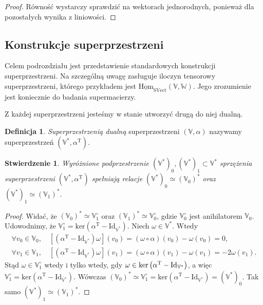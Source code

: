 \documentclass[11pt,a4paper]{report}
\newtheorem{proposition}[theorem]{Stwierdzenie}
\theoremstyle{definition}
\newtheorem{definition}[theorem]{Definicja}
\begin{document}
\begin{proof}
 Równość wystarczy sprawdzić na wektorach jednorodnych, ponieważ dla pozostałych wynika z liniowości.
\end{proof}

\subsection{Konstrukcje superprzestrzeni}

Celem podrozdziału jest przedstawienie standardowych konstrukcji superprzestrzeni. Na szczególną uwagę zasługuje iloczyn tensorowy superprzestrzeni, którego przykładem jest $\underline{\mathrm{Hom}}_{\mathrm{SVect}}(\mathbb{V},\mathbb{W})$. Jego zrozumienie jest koniecznie do badania supermacierzy.

Z każdej superprzestrzeni jesteśmy w stanie utworzyć drugą do niej dualną.

\begin{definition}
\textit{Superprzestrzenią dualną} superprzestrzeni $(\mathbb{V},\alpha)$ nazywamy superprzestrzeń $(\mathbb{V}^*,\alpha^\mathrm{T}).$
\end{definition}

\begin{proposition}
Wyróżnione podprzestrzenie $(\mathbb{V}^*)_0,(\mathbb{V}^*)_1 \subset \mathbb{V}^*$ sprzężenia superprzestrzeni $(\mathbb{V}^*,\alpha^\mathrm{T})$ spełniają relacje $(\mathbb{V}^*)_0 \simeq (\mathbb{V}_0)^*$ oraz  $(\mathbb{V}^*)_1 \simeq (\mathbb{V}_1)^*.$
\end{proposition}

\begin{proof}
 Widać, że $(\mathbb{V}_0)^* \simeq \mathbb{V}_1^{\circ}$ oraz $(\mathbb{V}_1)^* \simeq \mathbb{V}_0^{\circ}$, gdzie $\mathbb{V}_0^{\circ}$ jest anihilatorem $\mathbb{V}_0$. Udowodnimy, że $\mathbb{V}_1^{\circ} = \textrm{ker} \left( \alpha^\mathrm{T} - \textrm{Id}_{\mathbb{V}^*}\right)\!.$ Niech $\omega \in \mathbb{V}^*$. Wtedy
\begin{equation*} 
\begin{gathered}
\forall v_0 \in \mathbb{V}_0, \quad \left[ \left( \alpha^\mathrm{T} - \textrm{Id}_{\mathbb{V}^*}\right) \omega \right] (v_0) = \left( \omega \circ \alpha \right) (v_0) - \omega (v_0) = 0, \\
\forall v_1 \in \mathbb{V}_1, \quad \left[ \left( \alpha^\mathrm{T} - \textrm{Id}_{\mathbb{V}^*}\right) \omega \right] (v_1) = \left( \omega \circ \alpha \right) (v_1) - \omega (v_1) = -2\omega (v_1).
\end{gathered}
\end{equation*}
Stąd $\omega \in \mathbb{V}_1^{\circ}$ wtedy i tylko wtedy, gdy $\omega \in \rm{ker} \left( \alpha^\mathrm{T} - \textrm{Id}_{\mathbb{V}^*} \right)$, a więc $\mathbb{V}_1^{\circ} = \textrm{ker} \left( \alpha^\mathrm{T} - \textrm{Id}_{\mathbb{V}^*}\right)\!.$  Wówczas $(\mathbb{V}_0)^* \simeq \mathbb{V}_1^{\circ}=\textrm{ker} \left( \alpha^\mathrm{T} - \textrm{Id}_{\mathbb{V}^*}\right)=(\mathbb{V}^*)_0.$ Tak samo $(\mathbb{V}^*)_1 \simeq (\mathbb{V}_1)^*$.
\end{proof}  
\end{document}
